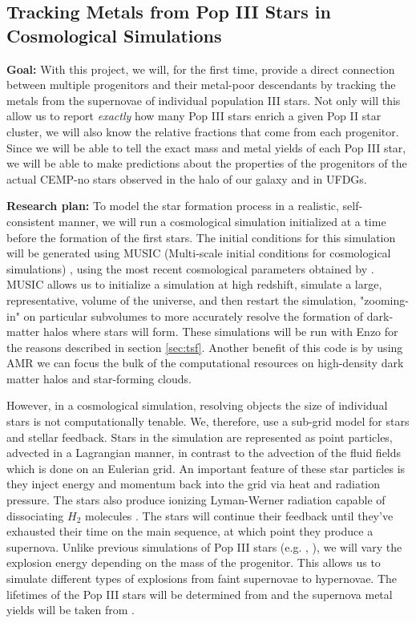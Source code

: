 \documentclass[letterpaper, 12pt]{article}
\begin{document}
\subsection{Tracking Metals from Pop III Stars in Cosmological Simulations}
\label{subsec:tracer_particles}

\textbf{Goal:} With this project, we will, for the first time, provide a direct connection between multiple progenitors and their metal-poor descendants by tracking the metals from the supernovae of individual population III stars. Not only will this allow us to report \textit{exactly} how many Pop III stars enrich a given Pop II star cluster, we will also know the relative fractions that come from each progenitor. Since we will be able to tell the exact mass and metal yields of each Pop III star, we will be able to make predictions about the properties of the progenitors of the actual CEMP-no stars observed in the halo of our galaxy and in UFDGs. 

\textbf{Research plan:} To model the star formation process in a realistic, self-consistent manner, we will run a cosmological simulation initialized at a time before the formation of the first stars. The initial conditions for this simulation will be generated using MUSIC (Multi-scale initial conditions for cosmological simulations) \citep{Hahn2011}, using the most recent cosmological parameters obtained by \cite{Planck2018}. MUSIC allows us to initialize a simulation at high redshift, simulate a large, representative, volume of the universe, and then restart the simulation, "zooming-in" on particular subvolumes to more accurately resolve the formation of dark-matter halos where stars will form. These simulations will be run with Enzo for the reasons described in section \ref{sec:tsf}. Another benefit of this code is by using AMR we can focus the bulk of the computational resources on high-density dark matter halos and star-forming clouds.

However, in a cosmological simulation, resolving objects the size of individual stars is not computationally tenable. We, therefore, use a sub-grid model for stars and stellar feedback. Stars in the simulation are represented as point particles, advected in a Lagrangian manner, in contrast to the advection of the fluid fields which is done on an Eulerian grid. An important feature of these star particles is they inject energy and momentum back into the grid via heat and radiation pressure. The stars also produce ionizing Lyman-Werner radiation capable of dissociating $H_2$ molecules \citep{Safranek-Shrader2012}. The stars will continue their feedback until they've exhausted their time on the main sequence, at which point they produce a supernova. Unlike previous simulations of Pop III stars (e.g. \cite{Chiaki2019}, \cite{Smith2015}), we will vary the explosion energy depending on the mass of the progenitor. This allows us to simulate different types of explosions from faint supernovae to hypernovae. The lifetimes of the Pop III stars will be determined from \cite{Schaerer2002} and the supernova metal yields will be taken from \cite{Nomoto2006}.
\end{document}
